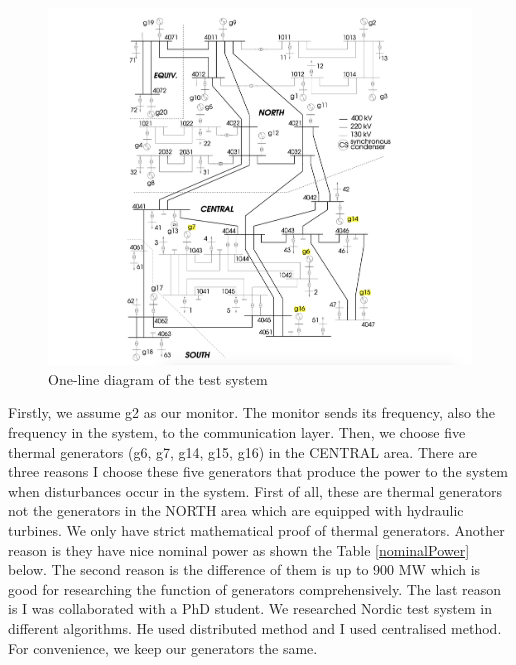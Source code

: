 \documentclass{report}
\begin{document}
\begin{figure}[htbp]
\centering
\includegraphics[width = .891\textwidth]{figure/4_1_1_nordic.png}
\caption{One-line diagram of the test system}
\label{4_1_1_nordic}
\end{figure}

Firstly, we assume g2 as our monitor. The monitor sends its frequency, also the frequency in the system, to the communication layer. Then, we choose five thermal generators  (g6, g7, g14, g15, g16) in the CENTRAL area. There are three reasons I choose these five generators that produce the power to the system when disturbances occur in the system. First of all, these are thermal generators not the generators in the NORTH area which are equipped with hydraulic turbines. We only have strict mathematical proof of thermal generators. Another reason is they have nice nominal power as shown the Table \textcolor{red}{\ref{nominalPower}} below. The second reason is the difference of them is up to 900 MW which is good for researching the function of generators comprehensively. The last reason is I was collaborated with a PhD student. We researched Nordic test system in different algorithms. He used distributed method and I used centralised method. For convenience, we keep our generators the same.\\
\end{document}
